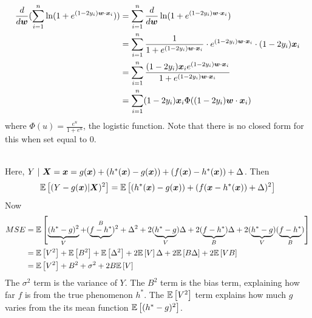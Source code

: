 \documentclass[12pt]{article}
\begin{document}
\begin{enumerate} 

$$ \begin{aligned} 
\frac{d}{d\boldsymbol{w}} ( \sum_{i=1}^n \ln (1 + e^{(1-2y_i)\boldsymbol{w} \cdot \boldsymbol{x}_i})) &= \sum_{i=1}^n \frac{d}{d\boldsymbol{w}} \ln (1 + e^{(1-2y_i)\boldsymbol{w} \cdot \boldsymbol{x}_i}) \\ &= \sum_{i=1}^n \frac{1}{1 + e^{(1-2y_i)\boldsymbol{w} \cdot \boldsymbol{x}_i}} \cdot e^{(1-2y_i)\boldsymbol{w} \cdot \boldsymbol{x}_i} \cdot (1-2y_i)\boldsymbol{x}_i \\ &= \sum_{i=1}^n \frac{(1-2y_i)\boldsymbol{x}_ie^{(1-2y_i)\boldsymbol{w} \cdot \boldsymbol{x}_i}}{1 + e^{(1-2y_i)\boldsymbol{w} \cdot \boldsymbol{x}_i}} \\ &= \sum_{i=1}^n (1-2y_i)\boldsymbol{x}_i \Phi((1-2y_i)\boldsymbol{w} \cdot \boldsymbol{x}_i) \end{aligned} $$ 
where $\Phi(u) = \frac{e^u}{1 + e^u}$, the logistic function. Note that there is no closed form for this when set equal to $0$. 

 \\
Here, $Y ~|~ \boldsymbol{X} = \boldsymbol{x} = g(\boldsymbol{x}) + (h^*(\boldsymbol{x}) - g(\boldsymbol{x})) + (f(\boldsymbol{x}) - h^*(\boldsymbol{x})) + \Delta$. Then $$ \mathbb{E}\left[(Y - g(\boldsymbol{x}) | \boldsymbol{X})^2\right] = \mathbb{E}\left[(h^*(\boldsymbol{x}) - g(\boldsymbol{x})) + (f(\boldsymbol{x} - h^*(\boldsymbol{x})) + \Delta)^2\right] $$ Now $$ \begin{aligned} MSE &= \mathbb{E}\left[\underbrace{(h^* - g)^2}_{V} + (\underbrace{f-h^*}^B)^2 + \Delta^2 + 2(\underbrace{h^*-g}_{V})\Delta + 2(\underbrace{f-h^*}_{B})\Delta + 2(\underbrace{h^*-g}_{V})(\underbrace{f-h^*}_{B})\right] 
\\ &= \mathbb{E}\left[V^2\right] + \mathbb{E}\left[B^2\right] + \mathbb{E}\left[\Delta^2\right] + 2\mathbb{E}\left[V\right]\Delta + 2\mathbb{E}\left[B\Delta\right] + 2\mathbb{E}\left[VB\right]
 \\ &= \mathbb{E}\left[V^2\right] + B^2 + \sigma^2 + 2B\mathbb{E}\left[V\right] \end{aligned} $$ 
The $\sigma^2$ term is the variance of $Y$. The $B^2$ term is the bias term, explaining how far $f$ is from the true phenomenon $h^*$. The $\mathbb{E}\left[V^2\right]$ term explains how much $g$ varies from the its mean function $\mathbb{E}\left[(h^*-g)^2\right]$. 

\end{enumerate}
\end{document}
